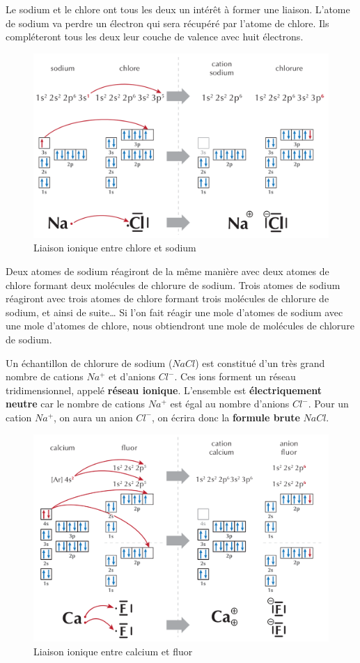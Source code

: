 \documentclass[
  11pt,
  a4paper,
  openany]{book}
\begin{document}
Le sodium et le chlore ont tous les deux un intérêt à former une liaison. L'atome de sodium va perdre un électron qui sera récupéré par l'atome de chlore. Ils compléteront tous les deux leur couche de valence avec huit électrons.

\begin{figure}

{\centering \includegraphics[width=0.6\linewidth]{images/NaCl-diagram} 

}

\caption{Liaison ionique entre chlore et sodium}\label{fig:NaCl-diagram}
\end{figure}

Deux atomes de sodium réagiront de la même manière avec deux atomes de chlore formant deux molécules de chlorure de sodium. Trois atomes de sodium réagiront avec trois atomes de chlore formant trois molécules de chlorure de sodium, et ainsi de suite\ldots{} Si l'on fait réagir une mole d'atomes de sodium avec une mole d'atomes de chlore, nous obtiendront une mole de molécules de chlorure de sodium.

Un échantillon de chlorure de sodium (\(NaCl\)) est constitué d'un très grand nombre de cations \(Na^+\) et d'anions \(Cl^-\). Ces ions forment un réseau tridimensionnel, appelé \textbf{réseau ionique}. L'ensemble est \textbf{électriquement neutre} car le nombre de cations \(Na^+\) est égal au nombre d'anions \(Cl^-\). Pour un cation \(Na^+\), on aura un anion \(Cl^-\), on écrira donc la \textbf{formule brute} \(NaCl\).

\newpage

\begin{figure}

{\centering \includegraphics[width=0.6\linewidth]{images/CaF2-diagram} 

}

\caption{Liaison ionique entre calcium et fluor}\label{fig:CaF2-diagram}
\end{figure}
\end{document}
